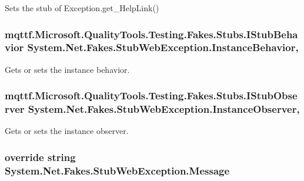 Sets the stub of Exception.\-get\-\_\-\-Help\-Link()

\hypertarget{class_system_1_1_net_1_1_fakes_1_1_stub_web_exception_a79c0727c611b46a167b4f1fa9374ca43}{
\subsubsection[{Instance\-Behavior}]{\setlength{\rightskip}{0pt plus 5cm}mqttf.\-Microsoft.\-Quality\-Tools.\-Testing.\-Fakes.\-Stubs.\-I\-Stub\-Behavior System.\-Net.\-Fakes.\-Stub\-Web\-Exception.\-Instance\-Behavior\hspace{0.3cm}{\ttfamily [get]}, {\ttfamily [set]}}}\label{class_system_1_1_net_1_1_fakes_1_1_stub_web_exception_a79c0727c611b46a167b4f1fa9374ca43}


Gets or sets the instance behavior.

\hypertarget{class_system_1_1_net_1_1_fakes_1_1_stub_web_exception_a76d3b932a496333877bdda508de48fb1}{
\subsubsection[{Instance\-Observer}]{\setlength{\rightskip}{0pt plus 5cm}mqttf.\-Microsoft.\-Quality\-Tools.\-Testing.\-Fakes.\-Stubs.\-I\-Stub\-Observer System.\-Net.\-Fakes.\-Stub\-Web\-Exception.\-Instance\-Observer\hspace{0.3cm}{\ttfamily [get]}, {\ttfamily [set]}}}\label{class_system_1_1_net_1_1_fakes_1_1_stub_web_exception_a76d3b932a496333877bdda508de48fb1}


Gets or sets the instance observer.

\hypertarget{class_system_1_1_net_1_1_fakes_1_1_stub_web_exception_a17dda151a5ca1e46ccd40e05edd5953b}{
\subsubsection[{Message}]{\setlength{\rightskip}{0pt plus 5cm}override string System.\-Net.\-Fakes.\-Stub\-Web\-Exception.\-Message\hspace{0.3cm}{\ttfamily [get]}}}\label{class_system_1_1_net_1_1_fakes_1_1_stub_web_exception_a17dda151a5ca1e46ccd40e05edd5953b}


